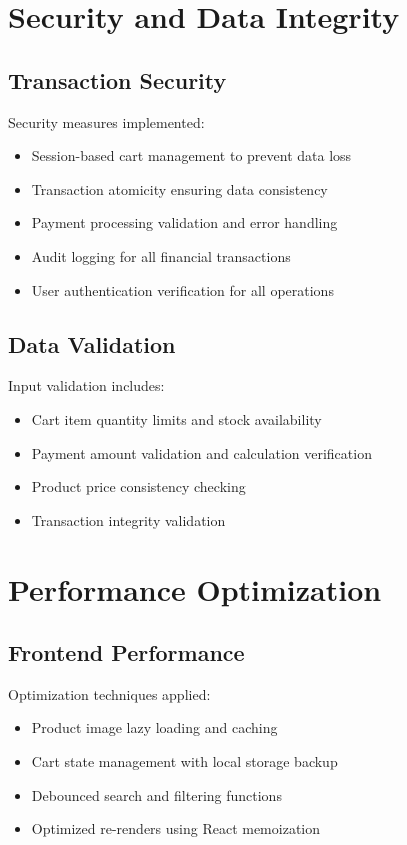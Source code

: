 \section{Security and Data Integrity}

\subsection*{Transaction Security}

Security measures implemented:
\begin{itemize}
  \item Session-based cart management to prevent data loss
  \item Transaction atomicity ensuring data consistency
  \item Payment processing validation and error handling
  \item Audit logging for all financial transactions
  \item User authentication verification for all operations
\end{itemize}

\subsection*{Data Validation}

Input validation includes:
\begin{itemize}
  \item Cart item quantity limits and stock availability
  \item Payment amount validation and calculation verification
  \item Product price consistency checking
  \item Transaction integrity validation
\end{itemize}

\section{Performance Optimization}

\subsection*{Frontend Performance}

Optimization techniques applied:
\begin{itemize}
  \item Product image lazy loading and caching
  \item Cart state management with local storage backup
  \item Debounced search and filtering functions
  \item Optimized re-renders using React memoization
\end{itemize}

